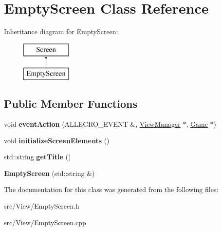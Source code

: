 \hypertarget{classEmptyScreen}{}\section{Empty\+Screen Class Reference}
\label{classEmptyScreen}
Inheritance diagram for Empty\+Screen\+:\begin{figure}[H]
\begin{center}
\leavevmode
\includegraphics[height=2.000000cm]{classEmptyScreen}
\end{center}
\end{figure}
\subsection*{Public Member Functions}
\begin{DoxyCompactItemize}
\item 
void {\bfseries event\+Action} (A\+L\+L\+E\+G\+R\+O\+\_\+\+E\+V\+E\+NT \&, \hyperlink{classViewManager}{View\+Manager} $\ast$, \hyperlink{classGame}{Game} $\ast$)\hypertarget{classEmptyScreen_acb3da5b502cfb7034c4455ad2ddd7510}{}\label{classEmptyScreen_acb3da5b502cfb7034c4455ad2ddd7510}

\item 
void {\bfseries initialize\+Screen\+Elements} ()\hypertarget{classEmptyScreen_aa2013df5685b5ef8ae87b3d8605da5b6}{}\label{classEmptyScreen_aa2013df5685b5ef8ae87b3d8605da5b6}

\item 
std\+::string {\bfseries get\+Title} ()\hypertarget{classEmptyScreen_ac392a14c00283e4fff6856a3000b4ecd}{}\label{classEmptyScreen_ac392a14c00283e4fff6856a3000b4ecd}

\item 
{\bfseries Empty\+Screen} (std\+::string \&)\hypertarget{classEmptyScreen_acdf0c5dab645394c04a7a28beab25acd}{}\label{classEmptyScreen_acdf0c5dab645394c04a7a28beab25acd}

\end{DoxyCompactItemize}


The documentation for this class was generated from the following files\+:\begin{DoxyCompactItemize}
\item 
src/\+View/Empty\+Screen.\+h\item 
src/\+View/Empty\+Screen.\+cpp\end{DoxyCompactItemize}
